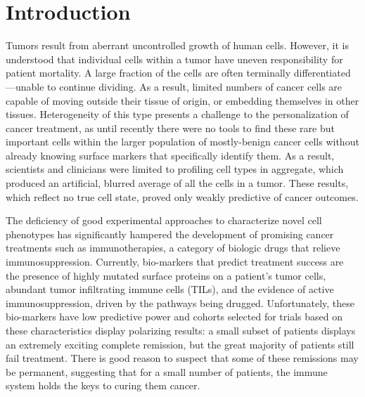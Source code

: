 
\chapter*{Introduction} %



Tumors result from aberrant uncontrolled growth of human cells. 
However, it is understood that individual cells within a tumor have uneven responsibility for patient mortality. 
A large fraction of the cells are often terminally differentiated---unable to continue dividing.
As a result, limited numbers of cancer cells are capable of moving outside their tissue of origin, or embedding themselves in other tissues.
Heterogeneity of this type presents a challenge to the personalization of cancer treatment, as until recently there were no tools to find these rare but important cells within the larger population of mostly-benign cancer cells without already knowing surface markers that specifically identify them. 
As a result, scientists and clinicians were limited to profiling cell types in aggregate, which produced an artificial, blurred average of all the cells in a tumor. 
These results, which reflect no true cell state, proved only weakly predictive of cancer outcomes.

The deficiency of good experimental approaches to characterize novel cell phenotypes has significantly hampered the development of promising cancer treatments such as immunotherapies, a category of biologic drugs that relieve immunosuppression. 
Currently, bio-markers that predict treatment success are the presence of highly mutated surface proteins on a patient's tumor cells, abundant tumor infiltrating immune cells (TILs), and the evidence of active immunosuppression, driven by the pathways being drugged.
Unfortunately, these bio-markers have low predictive power and cohorts selected for trials based on these characteristics display polarizing results: a small subset of patients displays an extremely exciting complete remission, but the great majority of patients still fail treatment.
There is good reason to suspect that some of these remissions may be permanent, suggesting that for a small number of patients, the immune system holds the keys to curing them cancer. 

